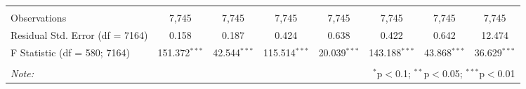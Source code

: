 \begin{table}[!htbp]
\begin{tabular}{@{\extracolsep{5pt}}lccccccc}
\hline \\[-1.8ex] 
Observations & 7,745 & 7,745 & 7,745 & 7,745 & 7,745 & 7,745 & 7,745 \\ 
Residual Std. Error (df = 7164) & 0.158 & 0.187 & 0.424 & 0.638 & 0.422 & 0.642 & 12.474 \\ 
F Statistic (df = 580; 7164) & 151.372$^{***}$ & 42.544$^{***}$ & 115.514$^{***}$ & 20.039$^{***}$ & 143.188$^{***}$ & 43.868$^{***}$ & 36.629$^{***}$ \\ 
\hline 
\hline \\[-1.8ex] 
\textit{Note:}  & \multicolumn{7}{r}{$^{*}$p$<$0.1; $^{**}$p$<$0.05; $^{***}$p$<$0.01} \\ 
\end{tabular} 
\end{table} 
